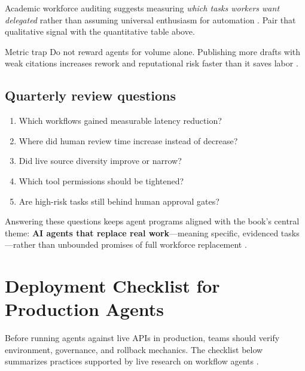 Academic workforce auditing suggests measuring \emph{which tasks workers want delegated}
rather than assuming universal enthusiasm for automation
\cite{arxiv2506workagents}. Pair that qualitative signal with the quantitative table above.

\begin{warningbox}{Metric trap}
Do not reward agents for volume alone. Publishing more drafts with weak citations increases
rework and reputational risk faster than it saves labor \cite{redditcomplextasks}.
\end{warningbox}

\subsection{Quarterly review questions}
\begin{enumerate}
  \item Which workflows gained measurable latency reduction?
  \item Where did human review time increase instead of decrease?
  \item Did live source diversity improve or narrow?
  \item Which tool permissions should be tightened?
  \item Are high-risk tasks still behind human approval gates?
\end{enumerate}

Answering these questions keeps agent programs aligned with the book's central theme:
\textbf{AI agents that replace real work}---meaning specific, evidenced tasks---rather than
unbounded promises of full workforce replacement \cite{mediumworkflowagents,recomaijobroles}.

\section{Deployment Checklist for Production Agents}
\label{sec:deployment-checklist}

Before running agents against live APIs in production, teams should verify environment,
governance, and rollback mechanics. The checklist below summarizes practices supported by
live research on workflow agents \cite{mediumworkflowagents,arxiv2506workagents}.

